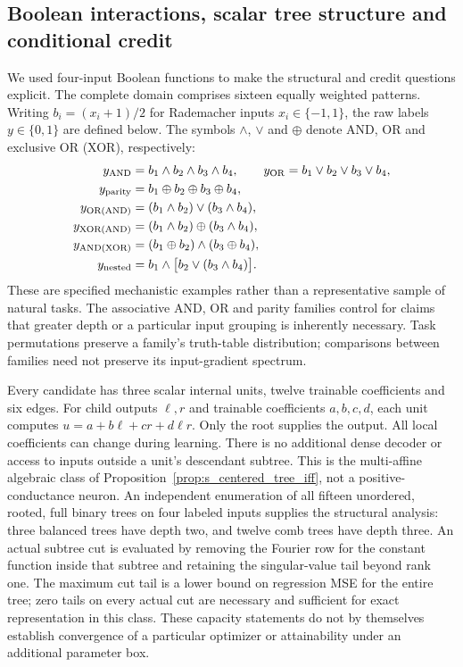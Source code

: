 \subsection{Boolean interactions, scalar tree structure and conditional credit}
\label{note:boolean_morphology}

We used four-input Boolean functions to make the structural and credit
questions explicit. The complete domain comprises sixteen equally weighted
patterns. Writing $b_i=(x_i+1)/2$ for Rademacher inputs $x_i\in\{-1,1\}$, the
raw labels $y\in\{0,1\}$ are defined below. The symbols $\land$,
$\lor$ and $\oplus$ denote AND, OR and exclusive OR (XOR), respectively:
\begin{align}
 y_{\rm AND}&=b_1\land b_2\land b_3\land b_4,\qquad
 y_{\rm OR}=b_1\lor b_2\lor b_3\lor b_4,\\
 y_{\rm parity}&=b_1\oplus b_2\oplus b_3\oplus b_4,\\
 y_{\rm OR(AND)}&=(b_1\land b_2)\lor(b_3\land b_4),\\
 y_{\rm XOR(AND)}&=(b_1\land b_2)\oplus(b_3\land b_4),\\
 y_{\rm AND(XOR)}&=(b_1\oplus b_2)\land(b_3\oplus b_4),\\
 y_{\rm nested}&=b_1\land\bigl[b_2\lor(b_3\land b_4)\bigr].
\end{align}
These are specified mechanistic examples rather than a representative
sample of natural tasks. The associative AND, OR and parity families control
for claims that greater depth or a particular input grouping is inherently
necessary. Task permutations preserve a family's truth-table distribution;
comparisons between families need not preserve its input-gradient spectrum.

Every candidate has three scalar internal units, twelve trainable
coefficients and six edges. For child outputs $\ell,r$ and trainable coefficients $a,b,c,d$, each
unit computes $u=a+b\ell+cr+d\ell r$. Only the root supplies the output. All local coefficients can change during learning. There is no
additional dense decoder or access to inputs outside a unit's descendant
subtree. This is the multi-affine algebraic class of
Proposition~\ref{prop:s_centered_tree_iff}, not a positive-conductance neuron.
An independent enumeration of all fifteen unordered, rooted, full binary
trees on four labeled inputs supplies the structural analysis: three balanced
trees have depth two, and twelve comb trees have depth three. An actual subtree
cut is evaluated by removing the Fourier row for the constant function
inside that subtree and retaining the singular-value tail beyond rank one. The maximum cut tail is a lower bound
on regression MSE for the entire tree; zero tails on every actual cut are
necessary and sufficient for exact representation in this class. These
capacity statements do not by themselves establish convergence of a
particular optimizer or attainability under an additional parameter box.

